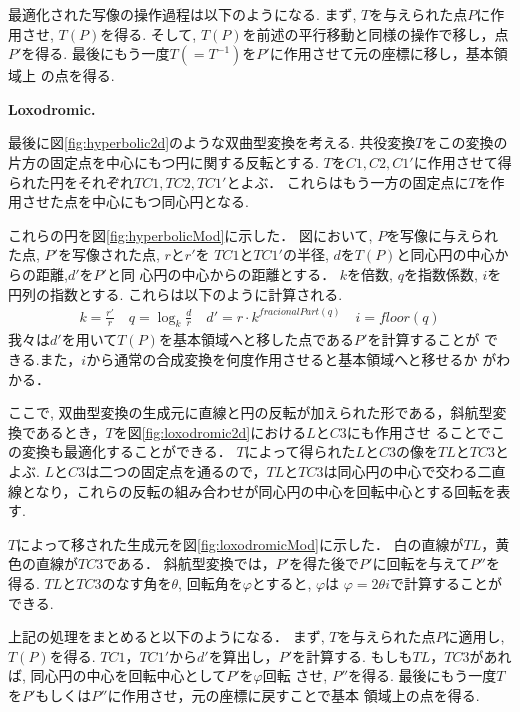 最適化された写像の操作過程は以下のようになる.
まず, $T$を与えられた点$P$に作用させ, $T(P)$を得る.
そして, $T(P)$を前述の平行移動と同様の操作で移し，点$P'$を得る.
最後にもう一度$T(= T^{-1})$を$P'$に作用させて元の座標に移し，基本領域上
の点を得る.

\noindent\textbf{Loxodromic.}

最後に図\ref{fig:hyperbolic2d}のような双曲型変換を考える.
共役変換$T$をこの変換の片方の固定点を中心にもつ円に関する反転とする.
$T$を$C1, C2, C1'$に作用させて得られた円をそれぞれ$TC1, TC2, TC1'$とよぶ．
これらはもう一方の固定点に$T$を作用させた点を中心にもつ同心円となる.

これらの円を図\ref{fig:hyperbolicMod}に示した．
図において, $P$を写像に与えられた点, $P'$を写像された点, $r$と$r'$を
$TC1$と$TC1'$の半径, $d$を$T(P)$と同心円の中心からの距離,$d'$を$P'$と同
心円の中心からの距離とする．
$k$を倍数, $q$を指数係数, $i$を円列の指数とする.
これらは以下のように計算される.
 \begin{align*}
  k = \frac{r'}{r} \quad
  q = \log_{k} \frac{d}{r} \quad
  d' = r \cdot k^{fracionalPart(q)} \quad
  i = floor(q)
 \end{align*}
我々は$d'$を用いて$T(P)$を基本領域へと移した点である$P'$を計算することが
できる.また，$i$から通常の合成変換を何度作用させると基本領域へと移せるか
がわかる．

ここで, 双曲型変換の生成元に直線と円の反転が加えられた形である，斜航型変
換であるとき，$T$を図\ref{fig:loxodromic2d}における$L$と$C3$にも作用させ
ることでこの変換も最適化することができる．
$T$によって得られた$L$と$C3$の像を$TL$と$TC3$とよぶ.
$L$と$C3$は二つの固定点を通るので，$TL$と$TC3$は同心円の中心で交わる二直
線となり，これらの反転の組み合わせが同心円の中心を回転中心とする回転を表
す.

$T$によって移された生成元を図\ref{fig:loxodromicMod}に示した．
白の直線が$TL$，黄色の直線が$TC3$である．
斜航型変換では，$P'$を得た後で$P'$に回転を与えて$P''$を得る.
$TL$と$TC3$のなす角を$\theta$, 回転角を$\varphi$とすると, $\varphi$は
$\varphi = 2 \theta i$で計算することができる.

上記の処理をまとめると以下のようになる．
まず, $T$を与えられた点$P$に適用し, $T(P)$を得る.
$TC1$，$TC1'$から$d'$を算出し，$P'$を計算する.
もしも$TL$，$TC3$があれば, 同心円の中心を回転中心として$P'$を$\varphi$回転
させ, $P''$を得る.
最後にもう一度$T$を$P'$もしくは$P''$に作用させ，元の座標に戻すことで基本
領域上の点を得る.


